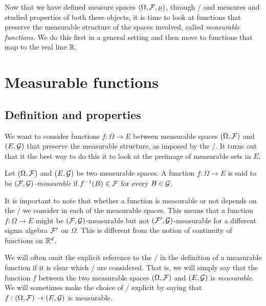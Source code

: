 
Now that we have defined measure spaces $(\Omega, \mathcal F, \mu)$, through \sigalgs/ and measures and studied properties of both these objects, it is time to look at functions that preserve the measurable structure of the spaces involved, called \emph{measurable functions}. We do this first in a general setting and then move to functions that map to the real line $\mathbb R$.

\section{Measurable functions}


\subsection{Definition and properties}

We want to consider functions $f : \Omega \to E$ between measurable spaces $(\Omega, \mathcal F)$ and $(E, \mathcal G)$ that preserve the measurable structure, as imposed by the \sigalgs/. It turns out that it the best way to do this it to look at the preimage of measurable sets in $E$.

\begin{definition}\label{def:measurable_function}
Let $(\Omega, \mathcal F)$ and $(E, \mathcal G)$ be two measurable spaces. A function $f: \Omega \to E$ is said to be \emph{$(\mathcal F, \mathcal G)$-measurable} if $f^{-1}(B) \in \mathcal F$ for every $B \in \mathcal G$.
\end{definition}

It is important to note that whether a function is measurable or not depends on the \sigalgs/ we consider in each of the measurable spaces. This means that a function $f : \Omega \to E$ might be $(\mathcal F, \mathcal G)$-measurable but not $(\mathcal F^\prime, \mathcal G)$-measurable for a different sigma algebra $\mathcal F^\prime$ on $\Omega$. This is different from the notion of continuity of functions on $\mathbb R^d$. 

We will often omit the explicit reference to the \sigalgs/ in the definition of a measurable function if it is clear which \sigalgs/ are considered. That is, we will simply say that the function $f$ between the two measurable spaces $(\Omega, \mathcal F)$ and $(E, \mathcal G)$ is \emph{measurable}. We will sometimes make the choice of \sigalgs/ explicit by saying that $f: (\Omega, \mathcal F) \to (E, \mathcal G)$ is measurable.

